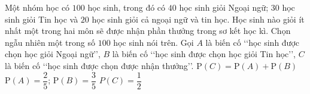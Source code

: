 \begin{ex}%
	Một nhóm học có $100$ học sinh, trong đó có $40$ học sinh giỏi Ngoại ngữ; $30$ học sinh giỏi Tin học và $20$ học sinh giỏi cả ngoại ngữ và tin học. Học sinh nào giỏi ít nhất một trong hai môn sẽ được nhận phần thưởng trong sơ kết học kì. Chọn ngẫu nhiên một trong số $100$ học sinh nói trên. Gọi $A$ là biến cố \lq\lq học sinh được chọn học giỏi Ngoại ngữ\rq\rq, $B$ là biến cố \lq\lq học sinh được chọn học giỏi Tin học\rq\rq, $C$ là biến cố \lq\lq học sinh được chọn được nhận thưởng\rq\rq.
	{$\mathrm{P}(C)=\mathrm{P}(A)+\mathrm{P}(B)$}
	{$\mathrm{P}(A)=\dfrac{2}{5}$; $\mathrm{P}(B)=\dfrac{3}{5}$}
	{\True $P(C)=\dfrac{1}{2}$}	
\end{ex}

